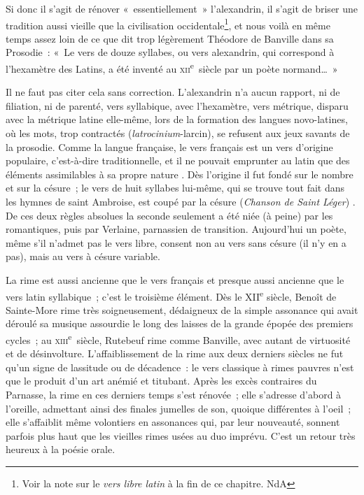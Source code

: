 \documentclass[french,twoside]{book} %
\begin{document}
\noindent Si donc il s’agit de rénover « essentiellement » l’alexandrin, il s’agit de briser une tradition aussi vieille que la civilisation occidentale\footnote{Voir la note sur le {\itshape vers libre latin} à la fin de ce chapitre. NdA}, et nous voilà en même temps assez loin de ce que dit trop légèrement Théodore de Banville dans sa Prosodie : « Le vers de douze syllabes, ou vers alexandrin, qui correspond à l’hexamètre des Latins, a été inventé au \textsc{xii}\textsuperscript{e} siècle par un poète normand… »\par
Il ne faut pas citer cela sans correction. L’alexandrin n’a aucun rapport, ni de filiation, ni de parenté, vers syllabique, avec l’hexamètre, vers métrique, disparu avec la métrique latine elle-même, lors de la formation des langues novo-latines, où les mots, trop contractés ({\itshape latrocinium}-larcin), se refusent aux jeux savants de la prosodie. Comme la langue française, le vers français est un vers d’origine populaire, c’est-à-dire traditionnelle, et il ne pouvait emprunter au latin que des éléments assimilables à sa propre nature . Dès l’origine il fut fondé sur le nombre et sur la césure ; le vers de huit syllabes lui-même, qui se trouve tout fait dans les hymnes de saint Ambroise, est coupé par la césure ({\itshape Chanson de Saint Léger}) . De ces deux règles absolues la seconde seulement a été niée (à peine) par les romantiques, puis par Verlaine, parnassien de transition. Aujourd’hui un poète, même s’il n’admet pas le vers libre, consent non au vers sans césure (il n’y en a pas), mais au vers à césure variable.\par
La rime est aussi ancienne que le vers français et presque aussi ancienne que le vers latin syllabique ; c’est le troisième élément. Dès le XII\textsuperscript{e} siècle, Benoît de Sainte-More rime très soigneusement, dédaigneux de la simple assonance qui avait déroulé sa musique assourdie le long des laisses de la grande épopée des premiers cycles ; au \textsc{xiii}\textsuperscript{e} siècle, Rutebeuf rime comme Banville, avec autant de virtuosité et de désinvolture. L’affaiblissement de la rime aux deux derniers siècles ne fut qu’un signe de lassitude ou de décadence : le vers classique à rimes pauvres n’est que le produit d’un art anémié et titubant. Après les excès contraires du Parnasse, la rime en ces derniers temps s’est rénovée ; elle s’adresse d’abord à l’oreille, admettant ainsi des finales jumelles de son, quoique différentes à l’oeil ; elle s’affaiblit même volontiers en assonances qui, par leur nouveauté, sonnent parfois plus haut que les vieilles rimes usées au duo imprévu. C’est un retour très heureux à la poésie orale.\par
\end{document}
